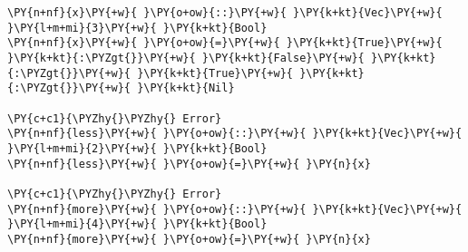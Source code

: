 \begin{Verbatim}[commandchars=\\\{\}]
\PY{n+nf}{x}\PY{+w}{ }\PY{o+ow}{::}\PY{+w}{ }\PY{k+kt}{Vec}\PY{+w}{ }\PY{l+m+mi}{3}\PY{+w}{ }\PY{k+kt}{Bool}
\PY{n+nf}{x}\PY{+w}{ }\PY{o+ow}{=}\PY{+w}{ }\PY{k+kt}{True}\PY{+w}{ }\PY{k+kt}{:\PYZgt{}}\PY{+w}{ }\PY{k+kt}{False}\PY{+w}{ }\PY{k+kt}{:\PYZgt{}}\PY{+w}{ }\PY{k+kt}{True}\PY{+w}{ }\PY{k+kt}{:\PYZgt{}}\PY{+w}{ }\PY{k+kt}{Nil}

\PY{c+c1}{\PYZhy{}\PYZhy{} Error}
\PY{n+nf}{less}\PY{+w}{ }\PY{o+ow}{::}\PY{+w}{ }\PY{k+kt}{Vec}\PY{+w}{ }\PY{l+m+mi}{2}\PY{+w}{ }\PY{k+kt}{Bool}
\PY{n+nf}{less}\PY{+w}{ }\PY{o+ow}{=}\PY{+w}{ }\PY{n}{x}

\PY{c+c1}{\PYZhy{}\PYZhy{} Error}
\PY{n+nf}{more}\PY{+w}{ }\PY{o+ow}{::}\PY{+w}{ }\PY{k+kt}{Vec}\PY{+w}{ }\PY{l+m+mi}{4}\PY{+w}{ }\PY{k+kt}{Bool}
\PY{n+nf}{more}\PY{+w}{ }\PY{o+ow}{=}\PY{+w}{ }\PY{n}{x}
\end{Verbatim}
